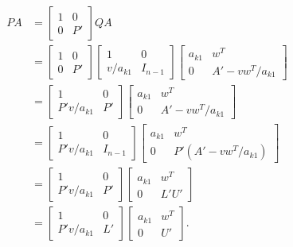\documentclass[a4paper,12pt,oneside]{article}
\begin{document}
\begin{align*}
	PA &=  \left[\begin{array}{cc}1 &0 \\
		0 & P' \end{array}\right]QA \\[7pt]
	&= \left[\begin{array}{cc}1 &0 \\
		0 & P' \end{array}\right] \left[\begin{array}{cc}1 & 0 \\
		v/a_{k1} &I_{n-1} \end{array}\right]  \left[\begin{array}{cc}a_{k1} & w^T \\
		0 &A' - vw^T/a_{k1}\end{array}\right] \\[7pt]
	&= \left[\begin{array}{cc}1 &0 \\
		P'v/a_{k1} & P' \end{array}\right] \left[\begin{array}{cc}a_{k1} & w^T \\ 
		0 & A' - vw^T/a_{k1} \end{array}\right] \\[7pt]
	&= \left[\begin{array}{cc}1 &0 \\
		P'v/a_{k1} &I_{n-1} \end{array}\right]  \left[\begin{array}{cc}a_{k1} & w^T \\ 
		0 & P'(A' - vw^T/a_{k1}) \end{array}\right]  \\[7pt]
	&= \left[\begin{array}{cc}1 &0 \\
		P'v/a_{k1} & P' \end{array}\right] \left[\begin{array}{cc}a_{k1} & w^T \\
		0 & L'U' \end{array}\right]   \\[7pt]
	&=  \left[\begin{array}{cc}1 & 0 \\
		P'v/a_{k1} &L' \end{array}\right]\left[\begin{array}{cc}a_{k1} & w^T \\
		0 & U' \end{array}\right]. 
\end{align*}
\end{document}

